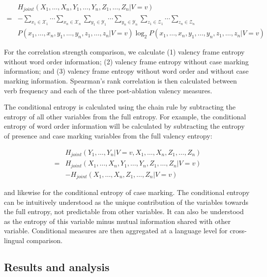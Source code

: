 \begin{equation*}
  \begin{split}
   & H_{joint}(X_1,\ldots,X_{n},Y_1,\ldots,Y_{n},Z_1,\ldots,Z_n|V=v) \\
  =& -\sum\limits_{x_1\in{}\mathcal{X}_1}\cdots\sum\limits_{x_n\in{}\mathcal{X}_n}\sum\limits_{y_1\in{}\mathcal{Y}_1}\cdots\sum\limits_{y_n\in{}\mathcal{Y}_n}\sum\limits_{z_1\in{}\mathcal{Z}_1}\cdots\sum\limits_{z_n\in{}\mathcal{Z}_n}\\
  &{P(x_1,\ldots,x_{n}, y_1,\ldots,y_{n}, z_1,\ldots,z_{n}|V=v)\log_2P(x_1,\ldots,x_{n}, y_1,\ldots,y_{n}, z_1,\ldots,z_{n}|V=v)}
  \end{split}
\end{equation*}

For the correlation strength comparison, we calculate (1) valency frame entropy without word order information; (2) valency frame entropy without case marking information; and (3) valency frame entropy without word order and without case marking information. Spearman's rank correlation is then calculated between verb frequency and each of the three post-ablation valency measures.

The conditional entropy is calculated using the chain rule by subtracting the entropy of all other variables from the full entropy. For example, the conditional entropy of word order information will be calculated by subtracting the entropy of presence and case marking variables from the full valency entropy:

\begin{equation*}
  \begin{split}
   & H_{joint}(Y_1,\ldots,Y_{n}| V = v, X_1,\ldots,X_{n},Z_1,\ldots,Z_n)\\
  =&H_{joint}(X_1,\ldots,X_{n},Y_1,\ldots,Y_{n},Z_1,\ldots,Z_{n}|V=v)  \\
  &- H_{joint}(X_1,\ldots,X_{n},Z_1,\ldots,Z_{n}|V=v)
  \end{split}
\end{equation*}

and likewise for the conditional entropy of case marking. The conditional entropy can be intuitively understood as the unique contribution of the variables towards the full entropy, not predictable from other variables. It can also be understood as the entropy of this variable minus mutual information shared with other variable. Conditional measures are then aggregated at a language level for cross-lingual comparison.

\subsection{Results and analysis}

